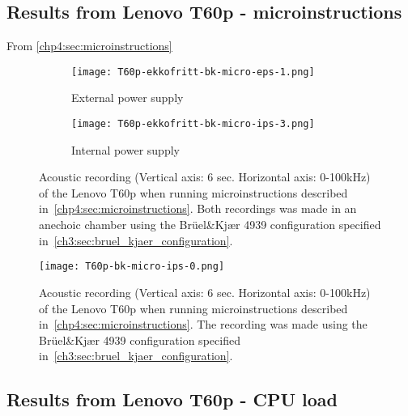 \subsection{Results from Lenovo T60p - microinstructions}\label{chp5:subsec:t60p_bk_results_micro}
From \autoref{chp4:sec:microinstructions} 
\begin{figure}[ht]
	\begin{subfigure}{0.8\textwidth}
	    \centering
	    \texttt{[image: T60p-ekkofritt-bk-micro-eps-1.png]}
	    \caption{External power supply}
	    \label{fig:T60p-ekkofritt-bk-micro-eps-1}
    \end{subfigure}
    \begin{subfigure}{0.8\textwidth}
	    \centering
    	\texttt{[image: T60p-ekkofritt-bk-micro-ips-3.png]}
    	\caption{Internal power supply}
    	\label{fig:T60p-ekkofritt-bk-micro-ips-3}
    \end{subfigure}
    \caption{Acoustic recording (Vertical axis: 6 sec. Horizontal axis: 0-100kHz) of the Lenovo T60p when running microinstructions described in~\autoref{chp4:sec:microinstructions}. Both recordings was made in an anechoic chamber using the Brüel\&Kjær 4939 configuration specified in~\autoref{ch3:sec:bruel_kjaer_configuration}. }
	\label{fig:T60p-ekkofritt-bk-micro}
\end{figure}

\begin{figure}[ht]
    \centering
    \texttt{[image: T60p-bk-micro-ips-0.png]}
    \caption{Acoustic recording (Vertical axis: 6 sec. Horizontal axis: 0-100kHz) of the Lenovo T60p when running microinstructions described in~\autoref{chp4:sec:microinstructions}. The recording was made using the Brüel\&Kjær 4939 configuration specified in~\autoref{ch3:sec:bruel_kjaer_configuration}. }
    \label{fig:T60p-bk-micro-ips-0}
\end{figure}

\subsection{Results from Lenovo T60p - CPU load}\label{chp5:subsec:t60p_bk_results_cpuload}

